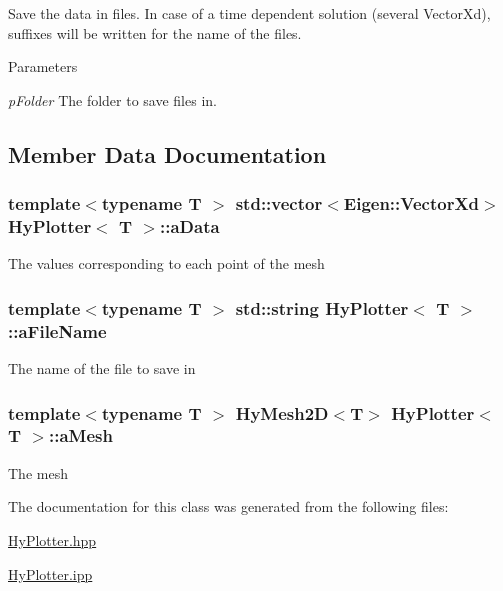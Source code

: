 Save the data in files. In case of a time dependent solution (several VectorXd), suffixes will be written for the name of the files. 


\begin{DoxyParams}{Parameters}
\item[{\em pFolder}]The folder to save files in. \end{DoxyParams}


\subsection{Member Data Documentation}
\hypertarget{classHyPlotter_a9aa282a34786a8d215a28b43816a2e6c}{
\subsubsection[{aData}]{\setlength{\rightskip}{0pt plus 5cm}template$<$typename T $>$ std::vector$<$Eigen::VectorXd$>$ {\bf HyPlotter}$<$ T $>$::{\bf aData}}}
\label{classHyPlotter_a9aa282a34786a8d215a28b43816a2e6c}
The values corresponding to each point of the mesh \hypertarget{classHyPlotter_a7ff236b2b02b1ee33554d0c2d483ca83}{
\subsubsection[{aFileName}]{\setlength{\rightskip}{0pt plus 5cm}template$<$typename T $>$ std::string {\bf HyPlotter}$<$ T $>$::{\bf aFileName}}}
\label{classHyPlotter_a7ff236b2b02b1ee33554d0c2d483ca83}
The name of the file to save in \hypertarget{classHyPlotter_add8bc0e65fe86f1e8efb025afd679f70}{
\subsubsection[{aMesh}]{\setlength{\rightskip}{0pt plus 5cm}template$<$typename T $>$ {\bf HyMesh2D}$<$T$>$ {\bf HyPlotter}$<$ T $>$::{\bf aMesh}}}
\label{classHyPlotter_add8bc0e65fe86f1e8efb025afd679f70}
The mesh 

The documentation for this class was generated from the following files:\begin{DoxyCompactItemize}
\item 
\hyperlink{HyPlotter_8hpp}{HyPlotter.hpp}\item 
\hyperlink{HyPlotter_8ipp}{HyPlotter.ipp}\end{DoxyCompactItemize}
